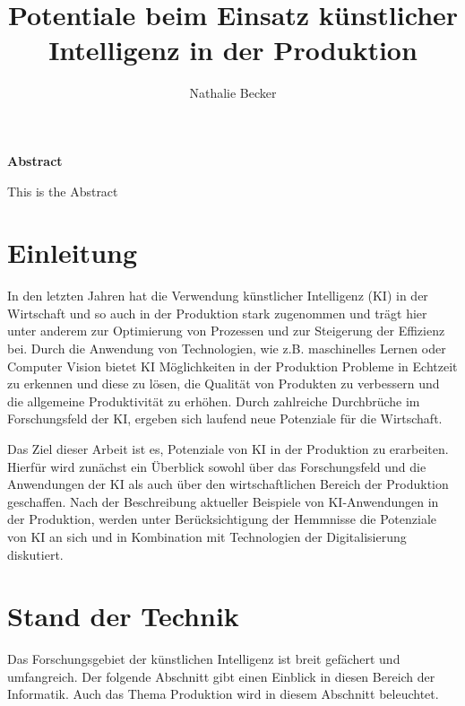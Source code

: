 \documentclass[a4paper,12pt, german]{report}
\begin{document}
\title{Potentiale beim Einsatz künstlicher Intelligenz in der Produktion}
\author{Nathalie Becker}


\begin{titlepage}
\maketitle
\end{titlepage}


\begin{center}
\textbf{Abstract}
\end{center}
This is the Abstract

\tableofcontents

\chapter{Einleitung}

In den letzten Jahren hat die Verwendung künstlicher Intelligenz (KI) in der Wirtschaft und so auch in der Produktion stark zugenommen und trägt hier unter anderem zur Optimierung von Prozessen und zur Steigerung der Effizienz bei. Durch die Anwendung von Technologien, wie z.B. maschinelles Lernen oder Computer Vision bietet KI Möglichkeiten in der Produktion Probleme in Echtzeit zu erkennen und diese zu lösen, die Qualität von Produkten zu verbessern und die allgemeine Produktivität zu erhöhen. Durch zahlreiche Durchbrüche im Forschungsfeld der KI, ergeben sich laufend neue Potenziale für die Wirtschaft. 

Das Ziel dieser Arbeit ist es, Potenziale von KI in der Produktion zu erarbeiten. Hierfür wird zunächst ein Überblick sowohl über das Forschungsfeld und die Anwendungen der KI als auch über den wirtschaftlichen Bereich der Produktion geschaffen. Nach der Beschreibung aktueller Beispiele von KI-Anwendungen in der Produktion, werden unter Berücksichtigung der Hemmnisse die Potenziale von KI an sich und in Kombination mit Technologien der Digitalisierung diskutiert.


\chapter{Stand der Technik}

Das Forschungsgebiet der künstlichen Intelligenz ist breit gefächert und umfangreich. Der folgende Abschnitt gibt einen Einblick in diesen Bereich der Informatik. Auch das Thema Produktion wird in diesem Abschnitt beleuchtet.
\end{document}
